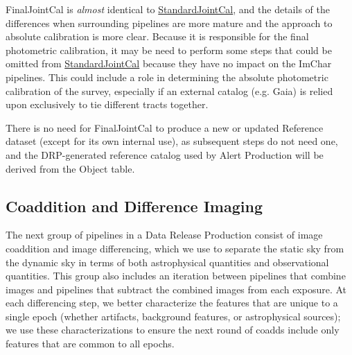 FinalJointCal is \emph{almost} identical to \hyperref[sec:drpStandardJointCal]{StandardJointCal}, and the details of the differences when surrounding pipelines are more mature and the approach to absolute calibration is more clear.  Because it is responsible for the final photometric calibration, it may be need to perform some steps that could be omitted from \hyperref[sec:drpStandardJointCal]{StandardJointCal} because they have no impact on the ImChar pipelines.  This could include a role in determining the absolute photometric calibration of the survey, especially if an external catalog (e.g. Gaia) is relied upon exclusively to tie different tracts together.

There is no need for FinalJointCal to produce a new or updated Reference dataset (except for its own internal use), as subsequent steps do not need one, and the DRP-generated reference catalog used by Alert Production will be derived from the Object table.

\subsection{Coaddition and Difference Imaging}
\label{sec:drp_coaddition_and_diffim}

The next group of pipelines in a Data Release Production consist of image coaddition and image differencing, which we use to separate the static sky from the dynamic sky in terms of both astrophysical quantities and observational quantities.  This group also includes an iteration between pipelines that combine images and pipelines that subtract the combined images from each exposure.  At each differencing step, we better characterize the features that are unique to a single epoch (whether artifacts, background features, or astrophysical sources); we use these characterizations to ensure the next round of coadds include only features that are common to all epochs.

